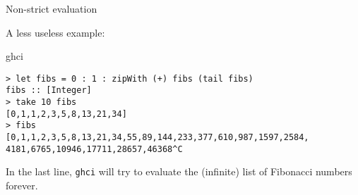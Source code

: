 %
\begin{frame}[fragile]{Non-strict evaluation}

A less useless example:

\begin{block}{ghci}
\begin{verbatim}
> let fibs = 0 : 1 : zipWith (+) fibs (tail fibs)
fibs :: [Integer]
> take 10 fibs
[0,1,1,2,3,5,8,13,21,34]
> fibs
[0,1,1,2,3,5,8,13,21,34,55,89,144,233,377,610,987,1597,2584,
4181,6765,10946,17711,28657,46368^C
\end{verbatim}
\end{block}

In the last line, \texttt{ghci} will try to evaluate the (infinite) list of
Fibonacci numbers forever.

\end{frame}
